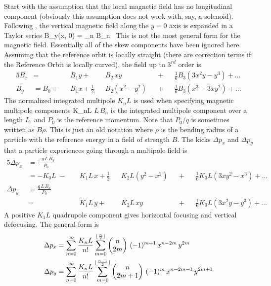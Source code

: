 Start with the assumption that the local magnetic field has no
longitudinal component (obviously this assumption does not work with,
say, a solenoid).  Following \mad, the vertical magnetic field along
the $y = 0$ axis is expanded in a Taylor series
\Begineq
  B_y(x, 0) = \sum_n B_n \, 
  \label{byx0b}
\Endeq
This is not the most
general form for the magnetic field. Essentially all of the skew
components have been ignored here. Assuming that the
reference orbit is locally straight (there are correction terms if the
Reference Orbit is locally curved), the field up to $3^{rd}$ order is
\begin{alignat}{5}
  B_x &=           &&B_1 y \plus         &&B_2 \, xy       && \plus && \frac{1}{6} B_3 (3x^2 y - y^3) \plus \ldots \\
  B_y &= B_0 \plus &&B_1 x + \frac{1}{2} &&B_2 (x^2 - y^2) && \plus && \frac{1}{6} B_3 (x^3 - 3x y^2) \plus \ldots
\end{alignat}
The normalized integrated multipole $K_nL$ is used when specifying magnetic
multipole components
\Begineq
  K_nL \equiv {}
\Endeq
$L \, B_n$ is the integrated multipole component over a length $L$,
and $P_0$ is the reference momentum. Note that $P_0/q$ is sometimes
written as $B\rho$. This is just an old notation where $\rho$ is the
bending radius of a particle with the reference energy in a field of
strength $B$. The kicks $\Delta p_x$ and $\Delta p_y$ that a
particle experiences going through a multipole field is
\begin{alignat}{5}
  \Delta p_x & = \frac{-q \, L \, B_y}{P_0} \label{pqlbp1} \\
             & = -K_0 L \;-\; 
             && K_1 L \, x \plus 
             \frac{1}{2} && K_2 L (y^2 - x^2) && \plus 
             && \frac{1}{6} K_3 L (3x y^2 - x^3) \plus \ldots 
             \nonumber \\
  \Delta p_y & = \frac{q \, L \, B_x}{P_0} \label{pqlbp2} \\
             & =     
             && K_1 L \, y \plus 
             && K_2 L \, xy && \plus 
             && \frac{1}{6} K_3L (3x^2 y - y^3) \plus \ldots \nonumber 
\end{alignat}
A positive $K_1L$ quadrupole component gives
horizontal focusing and vertical defocusing. The general form is
\begin{align}
  \Delta p_x &= \sum_{n = 0}^{\infty} \frac{K_n L}{n!} 
             \sum_{m = 0}^{\lfloor \frac{n}{2} \rfloor}
             \begin{pmatrix} n \cr 2m \end{pmatrix} \,
             (-1)^{m+1} \, x^{n-2m} \, y^{2m} \\
  \Delta p_y &= \sum_{n = 0}^{\infty} \frac{K_n L}{n!} 
             \sum_{m = 0}^{\lfloor \frac{n-1}{2} \rfloor}
             \begin{pmatrix} n \cr 2m+1 \end{pmatrix} \,
             (-1)^{m} \, x^{n-2m-1} \, y^{2m+1}
\end{align}

